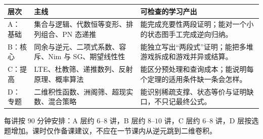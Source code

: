 \documentclass[a4paper,twoside,openright,11pt,fontset=fandol]{ctexbook}
\theoremstyle{definition}
\begin{document}
\begin{teach}[建议的教学分层]
\begin{longtable}{p{}p{}p{}}
\toprule
层次 & 主线 & 可检查的学习产出\\
\midrule
A：基础 & 集合与逻辑、代数恒等变形、排列组合、PN 态递推 & 能完成充要性两段证明；能对一个小的状态图手工完成逆向归纳。\\
B：核心 & 同余与逆元、二项式系数、容斥、Nim 与 SG、期望线性性 & 能独立写出“两段式”证明；能把多堆游戏拆成和游戏并异或结算。\\
C：提高 & LTE、杜教筛、递推数列、反射原理、概率算法 & 能区分预处理和查询成本；能说明每个定理的适用条件缺一条会怎样。\\
D：专题 & 二维积性函数、洲阁筛、超现实数、混合策略 & 能识别稀疏支撑、状态等价与证明缺口，不只记最终公式。\\
\bottomrule
\end{longtable}
每讲按 $90$ 分钟安排：A 层约 $6$--$8$ 讲，B 层约 $8$--$10$ 讲，C 层约 $6$--$8$ 讲，D 层按选题增加。课时仅作备课建议，不应在一节课内从逆元跳到二维卷积。
\end{teach}
\end{document}
